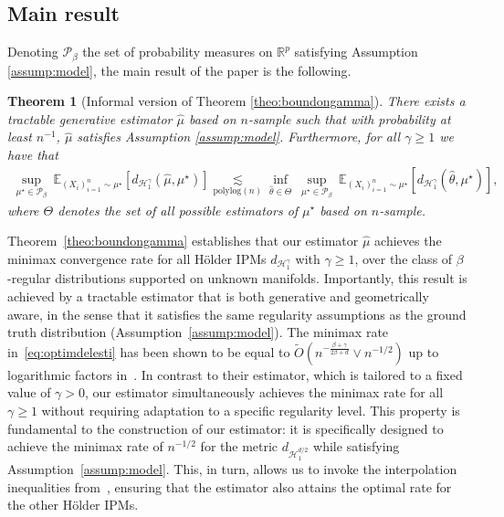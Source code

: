 \documentclass[10pt]{article}
\newtheorem{theorem}{Theorem}
\begin{document}
\subsection{Main result}
Denoting $\mathcal{P}_\beta$ the set of probability measures on $\mathbb{R}^p$ satisfying Assumption \ref{assump:model}, the main result of the paper is the following.
\begin{theorem}[Informal version of Theorem \ref{theo:boundongamma}] There exists a tractable generative estimator $\hat{\mu}$ based on $n$-sample such that with probability at least $n^{-1}$, $\hat{\mu}$ satisfies Assumption \ref{assump:model}. Furthermore, for all $\gamma\geq 1$ we have that
\begin{align}\label{eq:optimdelesti}
    \sup_{\mu^\star \in \mathcal{P}_\beta}\ \mathbb{E}_{(X_i)_{i=1}^n\sim \mu^\star}[d_{\mathcal{H}^{\gamma}_1}(\hat{\mu},\mu^\star)] \underset{{\mathrm{polylog}(n)}}{\lesssim} \inf_{\hat{\theta}\in \Theta}\ \sup_{\mu^\star\in \mathcal{P}_\beta}\ \mathbb{E}_{(X_i)_{i=1}^n\sim \mu^\star}[d_{\mathcal{H}^{\gamma}_1}(\hat{\theta},\mu^\star)],
\end{align}
where $\Theta$ denotes the set of all possible estimators  of $\mu^\star$ based on $n$-sample.
\end{theorem}
Theorem~\ref{theo:boundongamma} establishes that our estimator $\hat{\mu}$ achieves the minimax convergence rate for all Hölder IPMs $d_{\mathcal{H}^\gamma_1}$ with $\gamma \geq 1$, over the class of $\beta$-regular distributions supported on unknown manifolds. Importantly, this result is achieved by a tractable estimator that is both generative and geometrically aware, in the sense that it satisfies the same regularity assumptions as the ground truth distribution (Assumption~\ref{assump:model}). The minimax rate in~\eqref{eq:optimdelesti} has been shown to be equal to $\tilde{O}\left(n^{-\frac{\beta+\gamma}{2\beta + d}} \vee n^{-1/2}\right)$ up to logarithmic factors in~\cite{tang2023minimax}. In contrast to their estimator, which is tailored to a fixed value of $\gamma > 0$, our estimator simultaneously achieves the minimax rate for all $\gamma \geq 1$ without requiring adaptation to a specific regularity level. This property is fundamental to the construction of our estimator: it is specifically designed to achieve the minimax rate of $n^{-1/2}$ for the metric $d_{\mathcal{H}^{d/2}_1}$ while satisfying Assumption~\ref{assump:model}. This, in turn, allows us to invoke the interpolation inequalities from~\cite{stephanovitch2024ipm}, ensuring that the estimator also attains the optimal rate for the other Hölder IPMs.
\end{document}
